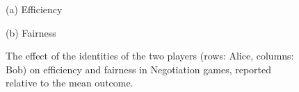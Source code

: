 \begin{figure}[ht]
\centering

\vspace{1ex}
\begin{minipage}[t]{0.48\textwidth}
    \centering
    \hspace{12em} (a) Efficiency \par\vspace{1ex}
    
\end{minipage}
\hfill
\begin{minipage}[t]{0.48\textwidth}
    \centering
    (b) Fairness \par\vspace{1ex}
    
\end{minipage}
\caption{The effect of the identities of the two players (rows: Alice, columns: Bob) on efficiency and fairness in Negotiation games, reported relative to the mean outcome.}

\label{table:models_negotiation}

\end{figure}
